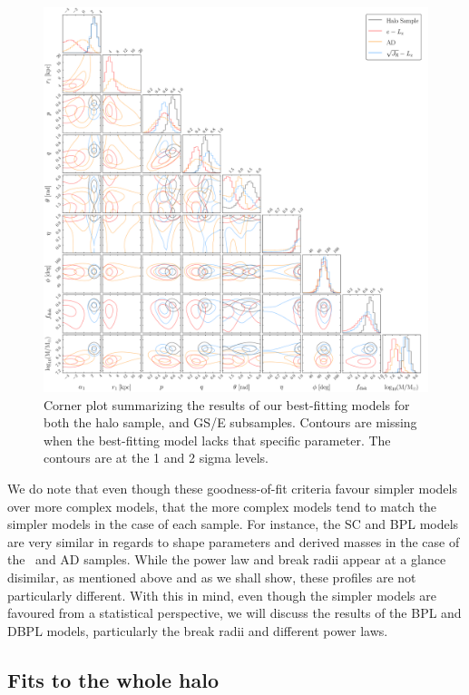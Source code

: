 \begin{figure}
    \centering
    \includegraphics[width=\textwidth]{figure/ch3/posterior.pdf}
    \caption{Corner plot summarizing the results of our best-fitting models for both the halo sample, and GS/E subsamples. Contours are missing when the best-fitting model lacks that specific parameter. The contours are at the 1 and 2 sigma levels.}
    \label{ch3:fig:posterior}
\end{figure}

We do note that even though these goodness-of-fit criteria favour simpler models over more complex models, that the more complex models tend to match the simpler models in the case of each sample. For instance, the SC and BPL models are very similar in regards to shape parameters and derived masses in the case of the \eLz\ and AD samples. While the power law and break radii appear at a glance disimilar, as mentioned above and as we shall show, these profiles are not particularly different. With this in mind, even though the simpler models are favoured from a statistical perspective, we will discuss the results of the BPL and DBPL models, particularly the break radii and different power laws.

\subsection{Fits to the whole halo}

